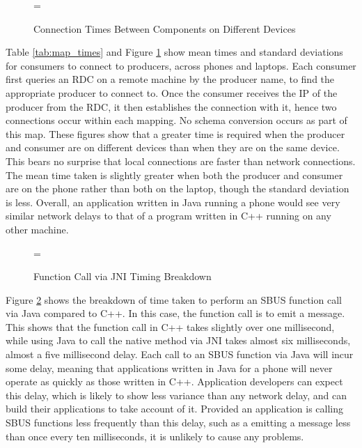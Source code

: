 \documentclass[12pt,twoside,notitlepage]{report}
\begin{document}
\begin{figure}[t]
\epsfxsize=\hsize
\centerline{}
\caption{Connection Times Between Components on Different Devices}
\label{fig:map_times}
\end{figure}

Table \ref{tab:map_times} and Figure \ref{fig:map_times} show mean times and standard deviations for consumers to connect to producers, across phones and laptops.
Each consumer first queries an RDC on a remote machine by the producer name, to find the appropriate producer to connect to. 
Once the consumer receives the IP of the producer from the RDC, it then establishes the connection with it, hence two connections occur within each mapping. 
No schema conversion occurs as part of this map. 
These figures show that a greater time is required when the producer and consumer are on different devices than when they are on the same device. 
This bears no surprise that local connections are faster than network connections. 
The mean time taken is slightly greater when both the producer and consumer are on the phone rather than both on the laptop, though the standard deviation is less. 
Overall, an application written in Java running a phone would see very similar network delays to that of a program written in C++ running on any other machine.

\begin{figure}[t]
\epsfxsize=\hsize
\centerline{}
\caption{Function Call via JNI Timing Breakdown}
\label{fig:jni_times}
\end{figure}

Figure \ref{fig:jni_times} shows the breakdown of time taken to perform an SBUS function call via Java compared to C++. 
In this case, the function call is to emit a message. 
This shows that the function call in C++ takes slightly over one millisecond, while using Java to call the native method via JNI takes almost six milliseconds, almost a five millisecond delay. 
Each call to an SBUS function via Java will incur some delay, meaning that applications written in Java for a phone will never operate as quickly as those written in C++.
Application developers can expect this delay, which is likely to show less variance than any network delay, and can build their applications to take account of it. 
Provided an application is calling SBUS functions less frequently than this delay, such as a emitting a message less than once every ten milliseconds, it is unlikely to cause any problems.
\end{document}
